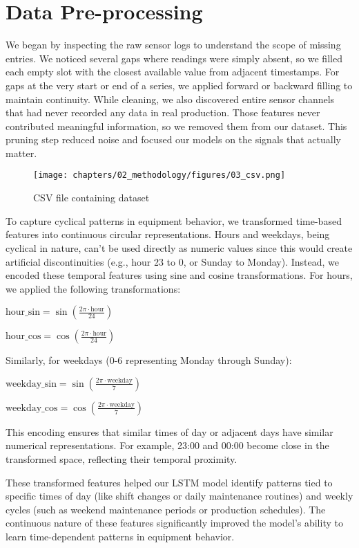 \section{Data Pre-processing}
We began by inspecting the raw sensor logs to understand the scope of missing entries. We noticed several gaps where readings were simply absent, so we filled each empty slot with the closest available value from adjacent timestamps. For gaps at the very start or end of a series, we applied forward or backward filling to maintain continuity. While cleaning, we also discovered entire sensor channels that had never recorded any data in real production. Those features never contributed meaningful information, so we removed them from our dataset. This pruning step reduced noise and focused our models on the signals that actually matter.

\begin{figure}[H]
    \centering
    \texttt{[image: chapters/02\_methodology/figures/03\_csv.png]}
    \caption{CSV file containing dataset}
\end{figure}

To capture cyclical patterns in equipment behavior, we transformed time-based features into continuous circular representations. Hours and weekdays, being cyclical in nature, can't be used directly as numeric values since this would create artificial discontinuities (e.g., hour 23 to 0, or Sunday to Monday). Instead, we encoded these temporal features using sine and cosine transformations.
For hours, we applied the following transformations:

\(\text{hour\_sin} = \sin\left(\frac{2 \pi \cdot \text{hour}}{24}\right)\)

\(\text{hour\_cos} = \cos\left(\frac{2 \pi \cdot \text{hour}}{24}\right)\)

Similarly, for weekdays (0-6 representing Monday through Sunday):

\(\text{weekday\_sin} = \sin\left(\frac{2 \pi \cdot \text{weekday}}{7}\right)\)

\(\text{weekday\_cos} = \cos\left(\frac{2 \pi \cdot \text{weekday}}{7}\right)\)

This encoding ensures that similar times of day or adjacent days have similar numerical representations. For example, 23:00 and 00:00 become close in the transformed space, reflecting their temporal proximity. 

These transformed features helped our LSTM model identify patterns tied to specific times of day (like shift changes or daily maintenance routines) and weekly cycles (such as weekend maintenance periods or production schedules). The continuous nature of these features significantly improved the model's ability to learn time-dependent patterns in equipment behavior.

